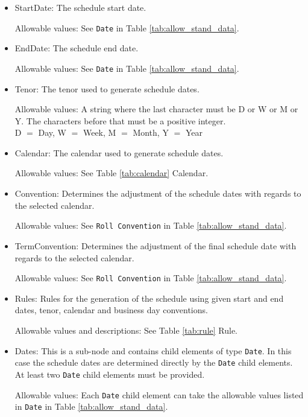 \begin{itemize}
\item StartDate:  The schedule start date.  

Allowable values:  See \lstinline!Date! in Table \ref{tab:allow_stand_data}.

\item EndDate: The schedule end date.  

Allowable values:  See \lstinline!Date! in Table \ref{tab:allow_stand_data}.

\item Tenor: The tenor used to generate schedule dates. 

Allowable values: A string where the last character must be D or W or
M or Y.  The characters before that must be a positive integer. \\D
$=$ Day, W $=$ Week, M $=$ Month, Y $=$ Year

\item Calendar: The calendar used to generate schedule  dates. 

Allowable values: See Table \ref{tab:calendar} Calendar.

\item Convention: Determines the adjustment of the schedule dates with
  regards to the selected calendar. 

Allowable values: See \lstinline!Roll Convention! in Table
\ref{tab:allow_stand_data}.

\item TermConvention: Determines the adjustment of the final schedule
  date with regards to the selected calendar. 

Allowable values: See \lstinline!Roll Convention! in Table \ref{tab:allow_stand_data}.

\item Rules: Rules for the generation of the schedule using given
  start and end dates, tenor, calendar and business day conventions. 

Allowable values and descriptions: See Table \ref{tab:rule} Rule.

\item Dates: This is a sub-node and contains child elements of type
  \lstinline!Date!. In this case the schedule dates are determined
  directly by the \lstinline!Date! child elements.  At least two
  \lstinline!Date! child elements must be provided.     

  Allowable values: Each \lstinline!Date!  child element can take the allowable values listed in \lstinline!Date! in
  Table \ref{tab:allow_stand_data}.

\end{itemize}




